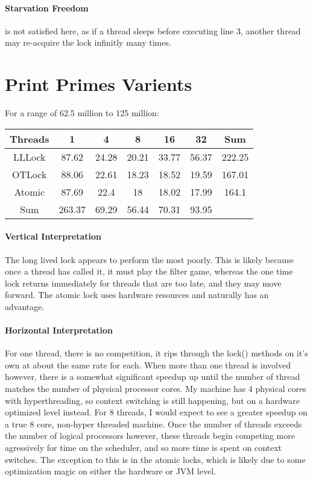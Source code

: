 \documentclass[11pt]{article}
\begin{document}
\paragraph{Starvation Freedom} is not satisfied here, as if a thread sleeps before executing line 3, another thread may re-acquire the lock infinitly many times.



\section{Print Primes Varients}
For a range of 62.5 million to 125 million:
\begin{center}
 \begin{tabular}{||c c c c c c c||}
 \hline
 Threads & 1 & 4 & 8 & 16 & 32 & Sum\\
 \hline\hline
 LLLock & 87.62 & 24.28 & 20.21 & 33.77 & 56.37 & 222.25\\
 \hline
 OTLock & 88.06 & 22.61 & 18.23 & 18.52 & 19.59 & 167.01\\
 \hline
 Atomic & 87.69 & 22.4 & 18 & 18.02 & 17.99 & 164.1\\
 \hline
 Sum & 263.37 & 69.29 & 56.44 & 70.31 & 93.95 &\\
 \hline
 \hline
\end{tabular}
\end{center}

\paragraph{Vertical Interpretation}The long lived lock appears to perform the most poorly. This is likely because once a thread has called it, it must play the filter game, whereas the one time lock returns immediately for threads that are too late, and they may move forward. The atomic lock uses hardware resources and naturally has an advantage.
\paragraph{Horizontal Interpretation} For one thread, there is no competition, it rips through the lock() methods on it's own at about the same rate for each. When more than one thread is involved however, there is a somewhat significant speedup up until the number of thread matches the number of physical processor cores. My machine has 4 physical cores with hyperthreading, so context switching is still happening, but on a hardware optimized level instead. For 8 threads, I would expect to see a greater speedup on a true 8 core, non-hyper threaded machine. Once the number of threads exceeds the number of logical processors however, these threads begin competing more agressively for time on the scheduler, and so more time is spent on context switches. The exception to this is in the atomic locks, which is likely due to some optimization magic on either the hardware or JVM level.
\end{document}
